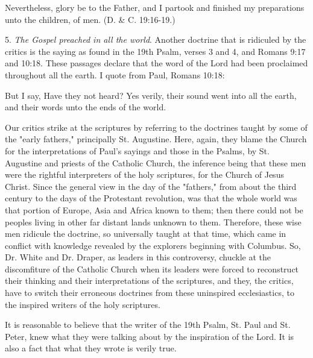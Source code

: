 Nevertheless, glory be to the Father, and I partook and finished my preparations unto the
children, of men. (D. \& C. 19:16-19.)

5. \textit{The Gospel preached in all the world}. Another doctrine that is ridiculed by the critics is
the saying as found in the 19th Psalm, verses 3 and 4, and Romans 9:17 and 10:18. These
passages declare that the word of the Lord had been proclaimed throughout all the earth. I
quote from Paul, Romans 10:18:

But I say, Have they not heard? Yes verily, their sound went into all the earth, and their
words unto the ends of the world.

Our critics strike at the scriptures by referring to the doctrines taught by some of the "early
fathers," principally St. Augustine. Here, again, they blame the Church for the interpretations
of Paul's sayings and those in the Psalms, by St. Augustine and priests of the Catholic
Church, the inference being that these men were the rightful interpreters of the holy
scriptures, for the Church of Jesus Christ. Since the general view in the day of the "fathers,"
from about the third century to the days of the Protestant revolution, was that the whole
world was that portion of Europe, Asia and Africa known to them; then there could not be
peoples living in other far distant lands unknown to them. Therefore, these wise men ridicule
the doctrine, so universally taught at that time, which came in conflict with knowledge
revealed by the explorers beginning with Columbus. So, Dr. White and Dr. Draper, as leaders
in this controversy, chuckle at the discomfiture of the Catholic Church when its leaders were
forced to reconstruct their thinking and their interpretations of the scriptures, and they, the
critics, have to switch their erroneous doctrines from these uninspired ecclesiastics, to the
inspired writers of the holy scriptures.

It is reasonable to believe that the writer of the 19th Psalm, St. Paul and St. Peter, knew what
they were talking about by the inspiration of the Lord. It is also a fact that what they wrote is
verily true.

